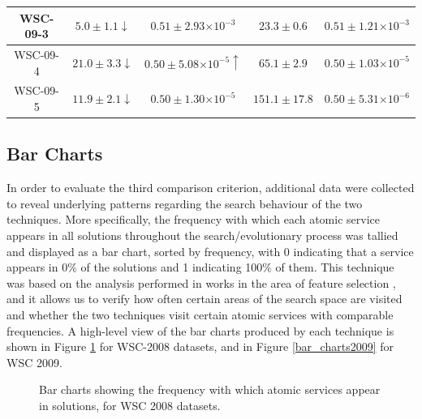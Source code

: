 \documentclass{llncs}
\providecommand{\e}[1]{\ensuremath{\times 10^{#1}}}
\begin{document}
\begin{table}[h]
\begin{tabular}{|c|c|c|c|c|}
WSC-09-3                       & $5.0 \pm 1.1 \downarrow$ & $0.51 \pm 2.93\e{-3}$          & $23.3 \pm 0.6$            & $0.51 \pm 1.21\e{-3}$          \\ \hline
WSC-09-4                       & $21.0\pm 3.3 \downarrow$ & $0.50 \pm 5.08\e{-5} \uparrow$ & $65.1 \pm 2.9$            & $0.50 \pm 1.03\e{-5}$          \\ \hline
WSC-09-5                       & $11.9\pm 2.1 \downarrow$ & $0.50 \pm 1.30\e{-5}$          & $151.1\pm 17.8$           & $0.50 \pm 5.31\e{-6}$          \\ \hline
\end{tabular}
\end{table}

\subsection{Bar Charts}

In order to evaluate the third comparison criterion, additional data were collected to reveal underlying patterns regarding the search behaviour of the two techniques. More specifically, the frequency with which each atomic service appears in all solutions throughout the search/evolutionary process was tallied and displayed as a bar chart, sorted by frequency, with 0 indicating that a service appears in 0\% of the solutions and 1 indicating 100\% of them. This technique was based on the analysis performed in works in the area of feature selection \cite{NguyenEvoStar2015,filterWrapperCEC2015}, and it allows us to verify how often certain areas of the search space are visited and whether the two techniques visit certain atomic services with comparable frequencies. A high-level view of the bar charts produced by each technique is shown in Figure \ref{bar_charts2008} for WSC-2008 datasets, and in Figure \ref{bar_charts2009} for WSC 2009.


\begin{figure}[h]
\centerline{
}
 \caption{Bar charts showing the frequency with which atomic services appear in solutions, for WSC 2008 datasets.}
 \label{bar_charts2008}
\end{figure}
\end{document}

